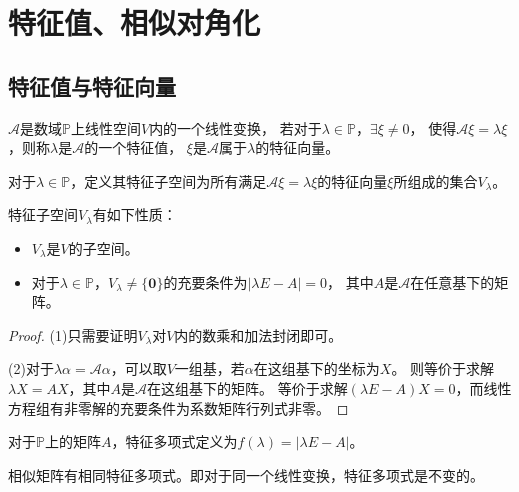 \section{特征值、相似对角化}


\subsection{特征值与特征向量}

\begin{definition}[特征值与特征向量]
  $\mathcal{A}$是数域$\mathbb{P}$上线性空间$V$内的一个线性变换，
  若对于$\lambda \in \mathbb{P}$，$\exists \xi \neq 0$，
  使得$\mathcal{A} \xi = \lambda \xi$，则称$\lambda$是$\mathcal{A}$的一个特征值，
  $\xi$是$\mathcal{A}$属于$\lambda$的特征向量。
\end{definition}

\begin{definition}[特征子空间]
  对于$\lambda \in \mathbb{P}$，定义其特征子空间为所有满足$\mathcal{A} \xi = \lambda \xi$的特征向量$\xi$所组成的集合$V_{\lambda}$。
\end{definition}

\begin{lemma}[特征子空间的性质]
  特征子空间$V_{\lambda}$有如下性质：
  \begin{itemize}
  \item $V_{\lambda}$是$V$的子空间。
  \item  对于$\lambda \in \mathbb{P}$，$V_{\lambda} \neq \{\mathbf{0}\}$的充要条件为$|\lambda E - A| = 0$，
    其中$A$是$\mathcal{A}$在任意基下的矩阵。
  \end{itemize}
\end{lemma}

\begin{proof}
  (1)只需要证明$V_{\lambda}$对$V$内的数乘和加法封闭即可。

  (2)对于$\lambda \alpha = \mathcal{A} \alpha$，可以取$V$一组基，若$\alpha$在这组基下的坐标为$X$。
  则等价于求解$\lambda X = AX$，其中$A$是$\mathcal{A}$在这组基下的矩阵。
  等价于求解$(\lambda E - A)X = 0$，而线性方程组有非零解的充要条件为系数矩阵行列式非零。
\end{proof}

\begin{definition}[特征多项式]
  对于$\mathbb{P}$上的矩阵$A$，特征多项式定义为$f(\lambda) = |\lambda E - A|$。
\end{definition}

\begin{theorem}[相似矩阵的特征多项式]
  相似矩阵有相同特征多项式。即对于同一个线性变换，特征多项式是不变的。
\end{theorem}

